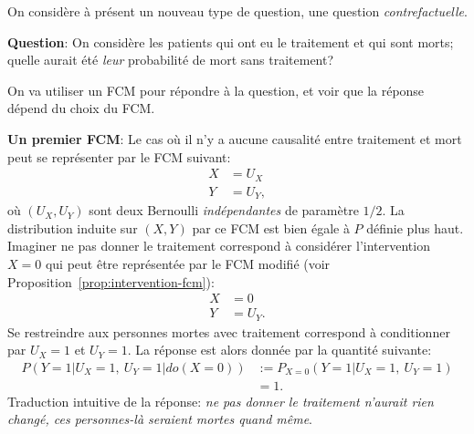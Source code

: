 On considère à présent un nouveau type de question, une question \emph{contrefactuelle}.

\textbf{Question}: On considère les patients qui ont eu le traitement et qui sont morts;
quelle aurait été \emph{leur} probabilité de mort sans traitement?

On va utiliser un FCM pour répondre à la question, et voir que la réponse
dépend du choix du FCM.

\textbf{Un premier FCM}: Le cas où il n'y a aucune causalité entre
traitement et mort peut se représenter par le FCM suivant:
\begin{align*}
  X&=U_X\\
  Y&=U_Y,
\end{align*}
où $(U_X,U_Y)$ sont deux Bernoulli \emph{indépendantes} de paramètre
$1/2$. La distribution induite sur $(X,Y)$ par ce FCM est bien égale à $P$
définie plus haut.
Imaginer ne pas donner le traitement correspond à considérer
l'intervention $X=0$ qui peut être représentée par le FCM modifié (voir
Proposition~\ref{prop:intervention-fcm}):
\begin{align*}
  X&=0\\
  Y&=U_Y.
\end{align*}
Se restreindre aux personnes mortes avec traitement correspond à
conditionner par $U_X=1$ et $U_Y=1$.  La réponse est alors donnée par
la quantité suivante:
\begin{align*}
P(Y=1|U_X=1,\ U_Y=1|do(X=0))&:=P_{X=0}(Y=1|U_X=1,\ U_Y=1)\\
&=1.
\end{align*}
Traduction intuitive de la réponse: \emph{ne pas donner le traitement
n'aurait rien changé, ces personnes-là seraient mortes quand même}.


